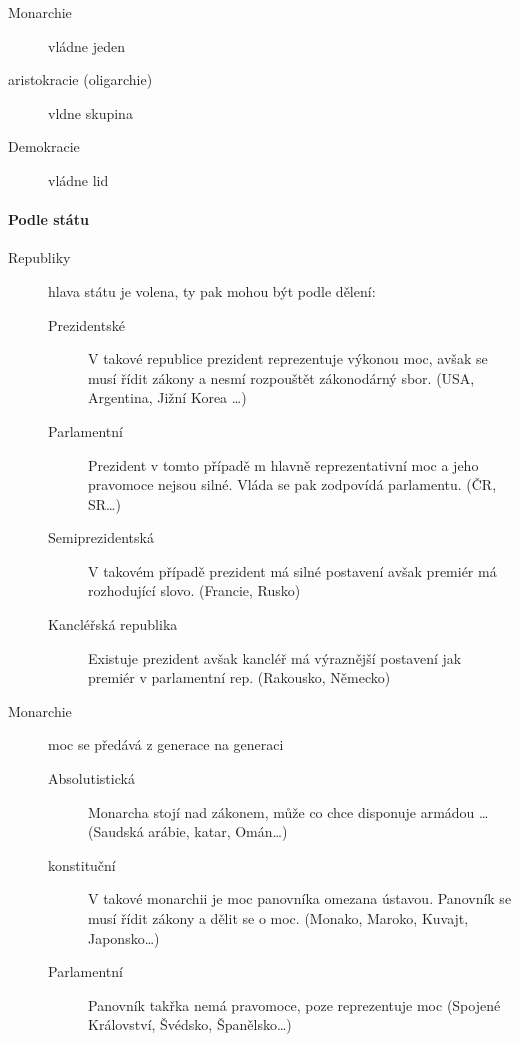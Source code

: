 \documentclass[10pt,a4paper,
twoside,%
]{report}
\begin{document}
\begin{description}
\item[Monarchie] vládne jeden

\item[aristokracie (oligarchie)] vldne skupina
\item[Demokracie] vládne lid
\end{description}

\paragraph{Podle  státu}
\begin{description}
\item[Republiky] hlava státu je volena, ty pak mohou být podle dělení:
\begin{description}
\item[Prezidentské] V takové republice prezident reprezentuje výkonou moc, avšak se musí řídit zákony a nesmí rozpouštět zákonodárný sbor. (USA, Argentina, Jižní Korea \dots)
\item[Parlamentní] Prezident v tomto případě m hlavně reprezentativní moc a jeho pravomoce nejsou silné. Vláda se pak zodpovídá parlamentu. (ČR, SR\dots)
\item[Semiprezidentská] V takovém případě prezident má silné postavení avšak premiér má rozhodující slovo. (Francie, Rusko)
\item[Kancléřská republika]Existuje prezident avšak kancléř má výraznější postavení jak premiér v parlamentní rep. (Rakousko, Německo)
\end{description}

\item[Monarchie] moc se předává z generace na generaci
\begin{description}
\item[Absolutistická] Monarcha stojí nad zákonem, může co chce disponuje armádou \dots (Saudská arábie, katar, Omán\dots)
\item[konstituční] V takové monarchii je moc panovníka omezana ústavou. Panovník se musí řídit zákony a dělit se o moc. (Monako, Maroko, Kuvajt, Japonsko\dots)
\item[Parlamentní] Panovník takřka nemá pravomoce, poze reprezentuje moc (Spojené Království, Švédsko, Španělsko\dots)
\end{description}
\end{description}
\end{document}
